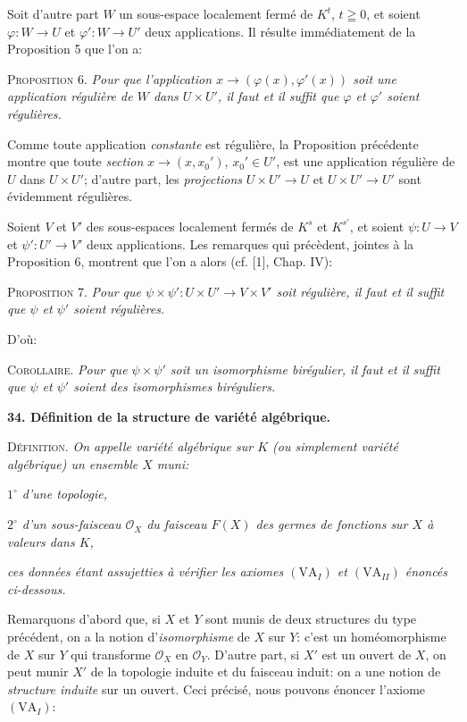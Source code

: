 Soit d'autre part $W$ un sous-espace localement fermé de $K^t$, $t \geqq 0$, et soient $\varphi\colon W \to U$ et $\varphi'\colon W \to U'$ deux applications. Il résulte immédiatement de la Proposition 5 que l'on a:

\textsc{Proposition 6.} \textit{Pour que l'application $x \to (\varphi(x), \varphi'(x))$ soit une application régulière de $W$ dans $U \times U'$, il faut et il suffit que $\varphi$ et $\varphi'$ soient régulières.}

Comme toute application \textit{constante} est régulière, la Proposition précédente montre que toute \textit{section} $x \to (x, x_0')$, $x_0' \in U'$, est une application régulière de $U$ dans $U \times U'$; d'autre part, les \textit{projections} $U \times U' \to U$ et $U \times U' \to U'$ sont évidemment régulières.

Soient $V$ et $V'$ des sous-espaces localement fermés de $K^s$ et $K^{s'}$, et soient $\psi\colon U \to V$ et $\psi'\colon U' \to V'$ deux applications. Les remarques qui précèdent, jointes à la Proposition 6, montrent que l'on a alors (cf. [1], Chap. IV):

\textsc{Proposition 7.} \textit{Pour que $\psi \times \psi' : U \times U' \to V \times V'$ soit régulière, il faut et il suffit que $\psi$ et $\psi'$ soient régulières.}

D'où:

\textsc{Corollaire.} \textit{Pour que $\psi \times \psi'$ soit un isomorphisme birégulier, il faut et il suffit que $\psi$ et $\psi'$ soient des isomorphismes biréguliers.}


\textbf{34. Définition de la structure de variété algébrique.}

\textsc{Définition.} \textit{On appelle variété algébrique sur $K$ (ou simplement variété algébrique) un ensemble $X$ muni:}

\textit{$1^\circ$ d'une topologie,}

\textit{$2^\circ$ d'un sous-faisceau $\mathcal{O}_X$ du faisceau $F(X)$ des germes de fonctions sur $X$ à valeurs dans $K$,}

\textit{ces données étant assujetties à vérifier les axiomes $(\mathrm{VA}_I)$ et $(\mathrm{VA}_{II})$ énoncés ci-dessous.}

Remarquons d'abord que, si $X$ et $Y$ sont munis de deux structures du type précédent, on a la notion d'\textit{isomorphisme} de $X$ sur $Y$: c'est un homéomorphisme de $X$ sur $Y$ qui transforme $\mathcal{O}_X$ en $\mathcal{O}_Y$. D'autre part, si $X'$ est un ouvert de $X$, on peut munir $X'$ de la topologie induite et du faisceau induit: on a une notion de \textit{structure induite} sur un ouvert. Ceci précisé, nous pouvons énoncer l'axiome $(\mathrm{VA}_I)$:


